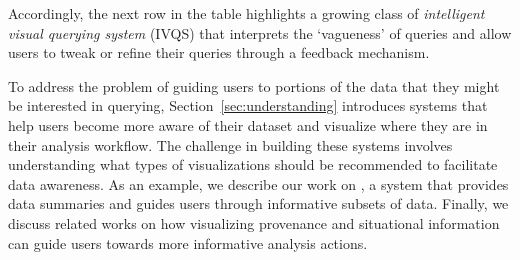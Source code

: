 \par Accordingly, the next row in the table highlights a growing class of \textit{intelligent visual querying system} (IVQS) that interprets the `vagueness' of queries and allow users to tweak or refine their queries through a feedback mechanism.  
\par To address the problem of guiding users to portions of the data that they might be interested in querying, Section~\ref{sec:understanding} introduces systems that help users become more aware of their dataset and visualize where they are in their analysis workflow. The challenge in building these systems involves understanding what types of visualizations should be recommended to facilitate data awareness. As an example, we describe our work on \sbd, a system that provides data summaries and guides users through informative subsets of data. Finally, we discuss related works on how visualizing provenance and situational information can guide users towards more informative analysis actions.
